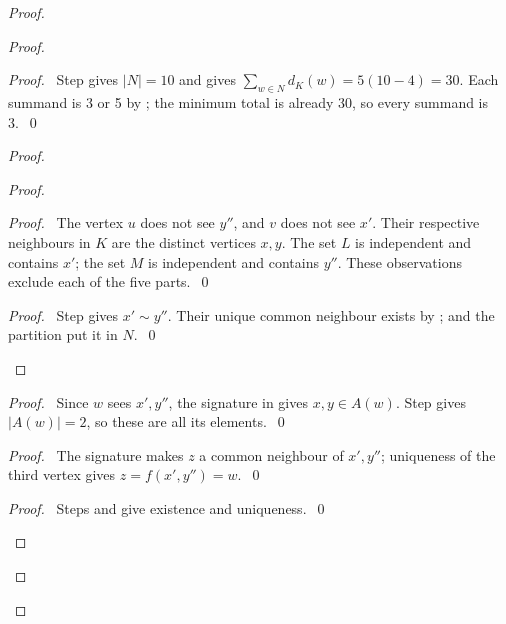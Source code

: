 \begin{proof}
 \begin{proof}
  \begin{proof}
   \pf\ Step  gives $|N|=10$ and  gives
   $\sum_{w\in N}d_K(w)=5(10-4)=30$. Each summand is 3 or 5 by ;
   the minimum total is already 30, so every summand is 3.~\qed
  \end{proof}
  \begin{proof}
   \begin{proof}
    \begin{proof}
     \pf\ The vertex $u$ does not see $y''$, and $v$ does not see $x'$.
     Their respective neighbours in $K$ are the distinct vertices $x,y$.
     The set $L$ is independent and contains $x'$; the set $M$ is independent and
     contains $y''$. These observations exclude each of the five parts.~\qed
    \end{proof}
    \qedstep
    \begin{proof}
     \pf\ Step  gives $x'\sim y''$.
     Their unique common neighbour exists by ;
      and the partition put it in $N$.~\qed
    \end{proof}
   \end{proof}
   \begin{proof}
    \pf\ Since $w$ sees $x',y''$, the signature in  gives
    $x,y\in A(w)$. Step  gives $|A(w)|=2$, so these are all its elements.~\qed
   \end{proof}
   \begin{proof}
    \pf\ The signature makes $z$ a common neighbour of $x',y''$;
    uniqueness of the third vertex gives $z=f(x',y'')=w$.~\qed
   \end{proof}
   \qedstep
   \begin{proof}\pf\ Steps  and  give existence and uniqueness.~\qed\end{proof}

\end{proof}
\end{proof}
\end{proof}
